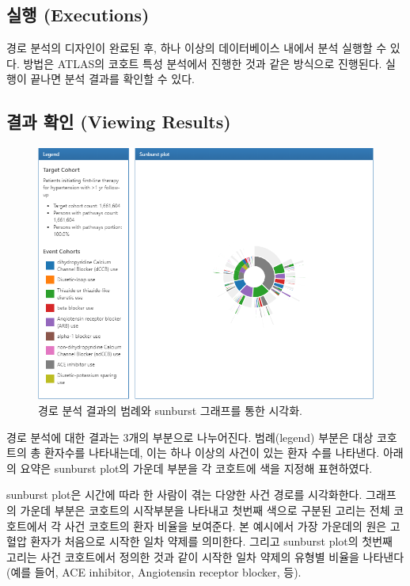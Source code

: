 \documentclass[11pt]{book}
\theoremstyle{definition}
\theoremstyle{definition}
\theoremstyle{definition}
\theoremstyle{remark}
\begin{document}
\subsection{실행 (Executions)}\label{-executions-1}

경로 분석의 디자인이 완료된 후, 하나 이상의 데이터베이스 내에서 분석
실행할 수 있다. 방법은 ATLAS의 코호트 특성 분석에서 진행한 것과 같은
방식으로 진행된다. 실행이 끝나면 분석 결과를 확인할 수 있다.

\subsection{결과 확인 (Viewing Results)}\label{--viewing-results}

\begin{figure}

{\centering \includegraphics[width=1\linewidth]{images/Characterization/atlasPathwaysResults} 

}

\caption{경로 분석 결과의 범례와 sunburst 그래프를 통한 시각화.}\label{fig:atlasPathwaysResults}
\end{figure}

경로 분석에 대한 결과는 3개의 부분으로 나누어진다. 범례(legend) 부분은
대상 코호트의 총 환자수를 나타내는데, 이는 하나 이상의 사건이 있는 환자
수를 나타낸다. 아래의 요약은 sunburst plot의 가운데 부분을 각 코호트에
색을 지정해 표현하였다.

sunburst plot은 시간에 따라 한 사람이 겪는 다양한 사건 경로를
시각화한다. 그래프의 가운데 부분은 코호트의 시작부분을 나타내고 첫번째
색으로 구분된 고리는 전체 코호트에서 각 사건 코호트의 환자 비율을
보여준다. 본 예시에서 가장 가운데의 원은 고혈압 환자가 처음으로 시작한
일차 약제를 의미한다. 그리고 sunburst plot의 첫번째 고리는 사건
코호트에서 정의한 것과 같이 시작한 일차 약제의 유형별 비율을 나타낸다
(예를 들어, ACE inhibitor, Angiotensin receptor blocker, 등).
\end{document}
